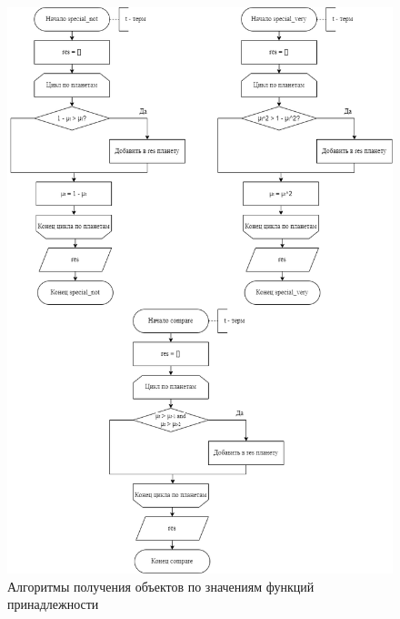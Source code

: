 \begin{figure}[h!btp]
	\centering
	\includegraphics[width=460pt]{inc/not_very.png}
	\caption{Алгоритмы получения объектов по значениям функций принадлежности}
	\label{fig:not-very}	
\end{figure}

\clearpage

